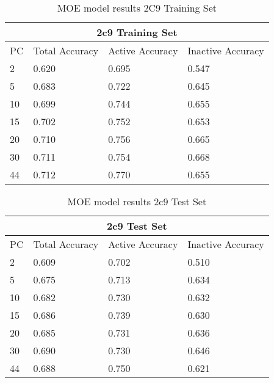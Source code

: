 \begin{table}[h]
\begin{tabular}{|l|l|l|l|}
\hline
\multicolumn{4}{|c|}{2c9 Training Set}                                                                \\ \hline
PC & Total Accuracy & Active Accuracy & Inactive Accuracy \\ \hline
2  & 0.620          & 0.695           & 0.547   \\ \hline
5  & 0.683          & 0.722           & 0.645   \\ \hline
10 & 0.699          & 0.744           & 0.655   \\ \hline
15 & 0.702          & 0.752           & 0.653   \\ \hline
20 & 0.710          & 0.756           & 0.665   \\ \hline
30 & 0.711          & 0.754           & 0.668   \\ \hline
44 & 0.712          & 0.770           & 0.655   \\ \hline
\end{tabular}
\caption{MOE model results 2C9 Training Set}
\end{table}


\begin{table}[h]
\begin{tabular}{|l|l|l|l|}
\hline
\multicolumn{4}{|c|}{2c9 Test Set}                                                                    \\ \hline
PC & Total Accuracy & Active Accuracy & Inactive Accuracy \\ \hline
2  & 0.609          & 0.702           & 0.510   \\ \hline
5  & 0.675          & 0.713           & 0.634   \\ \hline
10 & 0.682          & 0.730           & 0.632   \\ \hline
15 & 0.686          & 0.739           & 0.630   \\ \hline
20 & 0.685          & 0.731           & 0.636   \\ \hline
30 & 0.690          & 0.730           & 0.646   \\ \hline
44 & 0.688          & 0.750           & 0.621   \\ \hline
\end{tabular}
\caption{MOE model results 2c9 Test Set}
\end{table}


